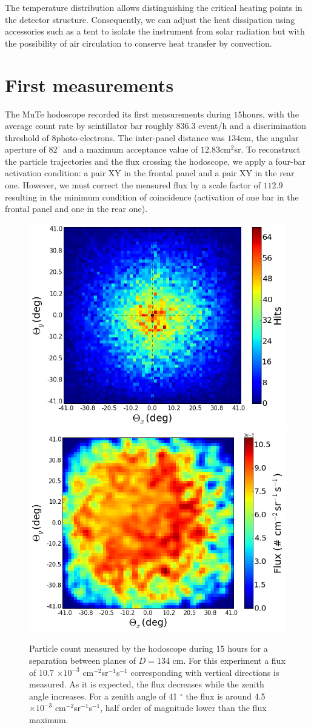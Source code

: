 \documentclass[letterpaper,11pt]{article}
\begin{document}
The temperature distribution allows distinguishing the critical heating points in the detector structure. Consequently, we can adjust the heat dissipation using accessories such as a tent to isolate the instrument from solar radiation but with the possibility of air circulation to conserve heat transfer by convection. 

\section{First measurements}
\label{measurement}
The MuTe hodoscope recorded its first measurements during $15$hours, with the average count rate by scintillator bar roughly $836.3$ event/h and a discrimination threshold of $8$photo-electrons. The inter-panel distance was $134$cm, the angular aperture of $82^{\circ}$ and a maximum acceptance value of $12.83$cm$^{2}$sr.  To reconstruct the particle trajectories and the flux crossing the hodoscope, we apply a four-bar activation condition: a pair XY in the frontal panel and a pair XY in the rear one. However, we must correct the measured flux by a scale factor of $112.9$resulting in the minimum condition of coincidence (activation of one bar in the frontal panel and one in the rear one). 

\begin{figure}[htb]
\centering
\includegraphics[width=0.48\columnwidth]{Figures/Hits_15h.png}
\includegraphics[width=0.49\columnwidth]{Figures/Flux.png}
\caption{Particle count measured by the hodoscope during 15 hours for a separation between planes of $D=134$ cm. For this experiment a flux of 10.7 $\times 10^{-3}$ cm$^{-2}$sr$^{-1}$s$^{-1}$ corresponding with vertical directions is measured. As it is expected, the flux decreases while the zenith angle increases. For a zenith angle of 41 $^{\circ}$ the flux is around 4.5 $\times 10^{-3}$ cm$^{-2}$sr$^{-1}$s$^{-1}$, half order of magnitude lower than the flux maximum.}
\label{fig:hits_15}
\end{figure}
\end{document}
